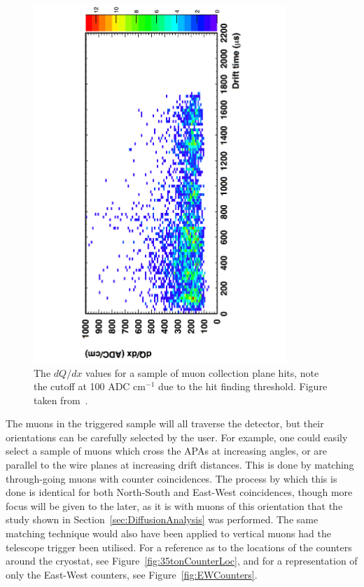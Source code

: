 \begin{figure}[h!]
  \centering
  \includegraphics[width=0.85\textwidth]{TingjunLifetime}
  \caption[$dQ/dx$ in the 35 ton as a function of drift time]
          {The $dQ/dx$ values for a sample of muon collection plane hits, note the cutoff at 100 ADC cm$^{-1}$ due to the hit finding threshold. Figure taken from~\citep{TingjunLifetime}.}
  \label{fig:TingjunLifetime}
\end{figure}  

The muons in the triggered sample will all traverse the detector, but their orientations can be carefully selected by the user. For example, one could easily select a sample of muons which cross the APAs at increasing angles, or are parallel to the wire planes at increasing drift distances. This is done by matching through-going muons with counter coincidences. The process by which this is done is identical for both North-South and East-West coincidences, though more focus will be given to the later, as it is with muons of this orientation that the study shown in Section~\ref{sec:DiffusionAnalysis} was performed. The same matching technique would also have been applied to vertical muons had the telescope trigger been utilised. For a reference as to the locations of the counters around the cryostat, see Figure~\ref{fig:35tonCounterLoc}, and for a representation of only the East-West counters, see Figure~\ref{fig:EWCounters}. \\

